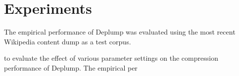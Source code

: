 \section{Experiments}
\label{sec:experiments}

The empirical performance of Deplump was evaluated using the most recent Wikipedia content dump as a test corpus.  





 to evaluate the effect of various parameter settings on the compression performance of Deplump.  The empirical per